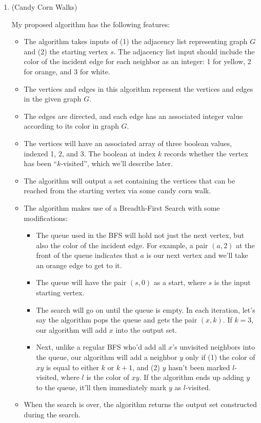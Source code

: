 \documentclass{article}
\begin{document}
\begin{enumerate}

  \item (Candy Corn Walks)

    My proposed algorithm has the following features:
    \begin{itemize}
      \item The algorithm takes inputs of (1) the adjacency list representing graph $G$ and (2) the starting vertex $s$. The adjacency list input should include the color of the incident edge for each neighbor as an integer: 1 for yellow, 2 for orange, and 3 for white.
      \item The vertices and edges in this algorithm represent the vertices and edges in the given graph $G$.
      \item The edges are directed, and each edge has an associated integer value according to its color in graph $G$.
      \item The vertices will have an associated array of three boolean values, indexed 1, 2, and 3. The boolean at index $k$ records whether the vertex has been ``$k$-visited'', which we'll describe later.
      \item The algorithm will output a set containing the vertices that can be reached from the starting vertex via some candy corn walk.
      \item The algorithm makes use of a Breadth-First Search with some modifications:
        \begin{itemize}
          \item The queue used in the BFS will hold not just the next vertex, but also the color of the incident edge. For example, a pair $(a, 2)$ at the front of the queue indicates that $a$ is our next vertex and we'll take an orange edge to get to it.
          \item The queue will have the pair $(s, 0)$ as a start, where $s$ is the input starting vertex.
          \item The search will go on until the queue is empty. In each iteration, let's say the algorithm pops the queue and gets the pair $(x, k)$. If $k = 3$, our algorithm will add $x$ into the output set.
          \item Next, unlike a regular BFS who'd add all $x$'s unvisited neighbors into the queue, our algorithm will add a neighbor $y$ only if (1) the color of $xy$ is equal to either $k$ or $k + 1$, and (2) $y$ hasn't been marked $l$-visited, where $l$ is the color of $xy$. If the algorithm ends up adding $y$ to the queue, it'll then immediately mark $y$ as $l$-visited.
        \end{itemize}
      \item When the search is over, the algorithm returns the output set constructed during the search.
    \end{itemize}


\end{enumerate}
\end{document}
